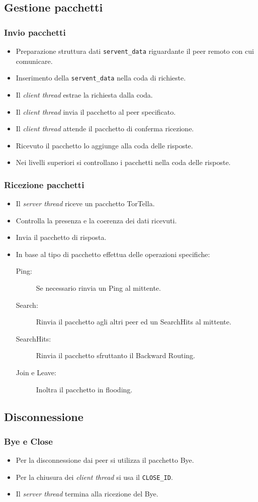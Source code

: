\documentclass[a4paper,italian,12pt]{beamer}
\begin{document}
		\subsection{Gestione pacchetti}
			\begin{frame}
				\frametitle{Invio pacchetti}
				\begin{itemize}
					\item Preparazione struttura dati \texttt{servent\_data} riguardante il peer remoto con cui comunicare.
					\item Inserimento della \texttt{servent\_data} nella coda di richieste.
					\item Il \textit{client thread} estrae la richiesta dalla coda.
					\item Il \textit{client thread} invia il pacchetto al peer specificato.
					\item Il \textit{client thread} attende il pacchetto di conferma ricezione.
					\item Ricevuto il pacchetto lo aggiunge alla coda delle risposte.
					\item Nei livelli superiori si controllano i pacchetti nella coda delle risposte.
				\end{itemize}
			\end{frame}
			\begin{frame}
				\frametitle{Ricezione pacchetti}
				\begin{itemize}
					\item Il \textit{server thread} riceve un pacchetto TorTella.
					\item Controlla la presenza e la coerenza dei dati ricevuti.
					\item Invia il pacchetto di risposta.
					\item In base al tipo di pacchetto effettua delle operazioni specifiche:
					\begin{description}
						\item[Ping:] Se necessario rinvia un Ping al mittente.
						\item[Search:] Rinvia il pacchetto agli altri peer ed un SearchHits al mittente.
						\item[SearchHits:] Rinvia il pacchetto sfruttanto il Backward Routing.
						\item[Join e Leave:] Inoltra il pacchetto in flooding.
					\end{description}
				\end{itemize}
			\end{frame}
		\subsection{Disconnessione}
			\begin{frame}
				\frametitle{Bye e Close}
				\begin{itemize}
					\item Per la disconnessione dai peer si utilizza il pacchetto Bye.
					\item Per la chiusura dei \textit{client thread} si usa il \texttt{CLOSE\_ID}.
					\item Il \textit{server thread} termina alla ricezione del Bye.
				\end{itemize}
			\end{frame}
\end{document}
